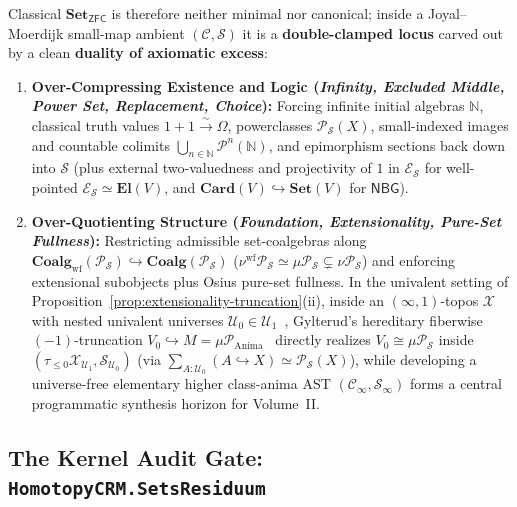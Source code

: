 Classical $\mathbf{Set}_{\mathsf{ZFC}}$ is therefore neither minimal nor canonical; inside a Joyal--Moerdijk small-map ambient $(\mathcal{C}, \mathcal{S})$ it is a \textbf{double-clamped locus} carved out by a clean \textbf{duality of axiomatic excess}:
\begin{enumerate}
  \item \textbf{Over-Compressing Existence and Logic (\emph{Infinity, Excluded Middle, Power Set, Replacement, Choice}):} Forcing infinite initial algebras $\mathbb{N}$, classical truth values $1 + 1 \xrightarrow{\sim} \Omega$, powerclasses $\mathcal{P}_{\mathcal{S}}(X)$, small-indexed images and countable colimits $\bigcup_{n \in \mathbb{N}} \mathcal{P}^n(\mathbb{N})$, and epimorphism sections back down into $\mathcal{S}$ (plus external two-valuedness and projectivity of $1$ in $\mathcal{E}_{\mathcal{S}}$ for well-pointed $\mathcal{E}_{\mathcal{S}} \simeq \mathbf{El}(V)$, and $\mathbf{Card}(V) \hookrightarrow \mathbf{Set}(V)$ for $\mathsf{NBG}$).
  \item \textbf{Over-Quotienting Structure (\emph{Foundation, Extensionality, Pure-Set Fullness}):} Restricting admissible set-coalgebras along $\mathbf{Coalg}_{\mathrm{wf}}(\mathcal{P}_{\mathcal{S}}) \hookrightarrow \mathbf{Coalg}(\mathcal{P}_{\mathcal{S}})$ ($\nu^{\mathrm{wf}} \mathcal{P}_{\mathcal{S}} \simeq \mu \mathcal{P}_{\mathcal{S}} \subsetneq \nu \mathcal{P}_{\mathcal{S}}$) and enforcing extensional subobjects plus Osius pure-set fullness. In the univalent setting of Proposition~\ref{prop:extensionality-truncation}(ii), inside an $(\infty, 1)$-topos $\mathcal{X}$ with nested univalent universes $\mathcal{U}_0 \in \mathcal{U}_1$~\cite[\S 6.1.6]{Lurie09}, Gylterud's hereditary fiberwise $(-1)$-truncation $V_0 \hookrightarrow M = \mu \mathcal{P}_{\mathrm{Anima}}$~\cite[Thm.~3.9]{Gylterud18} directly realizes $V_0 \cong \mu \mathcal{P}_{\mathcal{S}}$ inside $(\tau_{\le 0}\mathcal{X}_{\mathcal{U}_1}, \mathcal{S}_{\mathcal{U}_0})$ (via $\sum_{A : \mathcal{U}_0} (A \hookrightarrow X) \simeq \mathcal{P}_{\mathcal{S}}(X)$), while developing a universe-free elementary higher class-anima AST $(\mathcal{C}_\infty, \mathcal{S}_\infty)$ forms a central programmatic synthesis horizon for Volume~II.
\end{enumerate}

\subsection{The Kernel Audit Gate: \texttt{HomotopyCRM.SetsResiduum}}\label{subsec:sets-residuum-kernel-gate}

